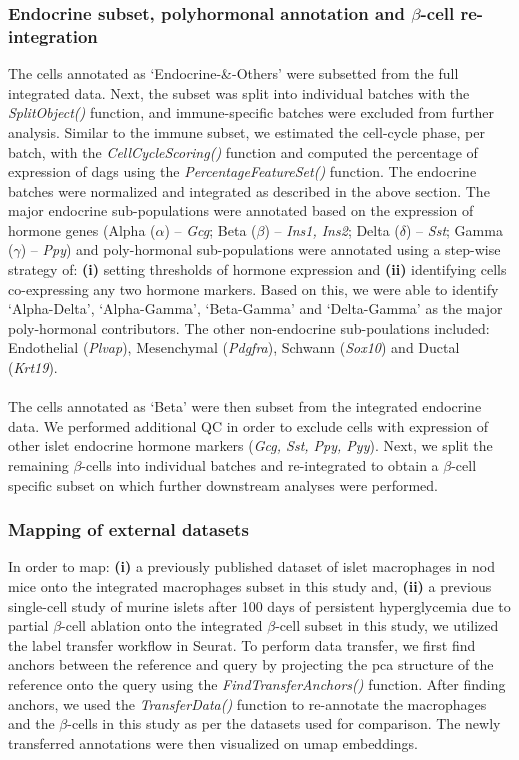 \subsubsection{\large Endocrine subset, polyhormonal annotation and $\beta$-cell re-integration}
The cells annotated as `Endocrine-\&-Others' were subsetted from the full integrated data. Next, the subset was split into individual batches with the \textit{SplitObject()} function, and immune-specific batches were excluded from further analysis. Similar to the immune subset, we estimated the cell-cycle phase, per batch, with the \textit{CellCycleScoring()} function and computed the percentage of expression of \glspl{dag} using the  \textit{PercentageFeatureSet()} function. The endocrine batches were normalized and integrated as described in the above section. The major endocrine sub-populations were annotated based on the expression of hormone genes (Alpha ($\alpha$) – \textit{Gcg}; Beta ($\beta$) – \textit{Ins1, Ins2}; Delta ($\delta$) – \textit{Sst}; Gamma ($\gamma$) – \textit{Ppy}) and poly-hormonal sub-populations were annotated using a step-wise strategy of: \textbf{(i)} setting thresholds of hormone expression and \textbf{(ii)} identifying cells co-expressing any two hormone markers. Based on this, we were able to identify ‘Alpha-Delta’, ‘Alpha-Gamma’, ‘Beta-Gamma’ and ‘Delta-Gamma’ as the major poly-hormonal contributors. The other non-endocrine sub-poulations included: Endothelial (\textit{Plvap}), Mesenchymal (\textit{Pdgfra}), Schwann (\textit{Sox10}) and Ductal (\textit{Krt19}).\\\\The cells annotated as ‘Beta’ were then subset from the integrated endocrine data. We performed additional QC in order to exclude cells with  expression of other islet endocrine hormone markers (\textit{Gcg, Sst, Ppy, Pyy}). Next, we split the remaining $\beta$-cells into individual batches and re-integrated to obtain a $\beta$-cell specific subset on which further downstream analyses were performed.   


\subsubsection{\large Mapping of external datasets}
\label{sec:chp2_methods_labeltransfer}
In order to map: \textbf{(i)} a previously published dataset of islet macrophages in \gls{nod} mice \textbf{\cite{zakharov_single-cell_2020}} onto the integrated macrophages subset in this study and, \textbf{(ii)} a previous single-cell study of murine islets after 100 days of persistent hyperglycemia due to partial $\beta$-cell ablation \textbf{\cite{sachs_targeted_2020}} onto the integrated $\beta$-cell subset in this study, we utilized the label transfer workflow in Seurat. To perform data transfer, we first find anchors between the reference and query by projecting the \gls{pca} structure of the reference onto the query using the \textit{FindTransferAnchors()} function. After finding anchors, we used the \textit{TransferData()} function to re-annotate the macrophages and the $\beta$-cells in this study as per the datasets used for comparison. The newly transferred annotations were then visualized on \gls{umap} embeddings. 


